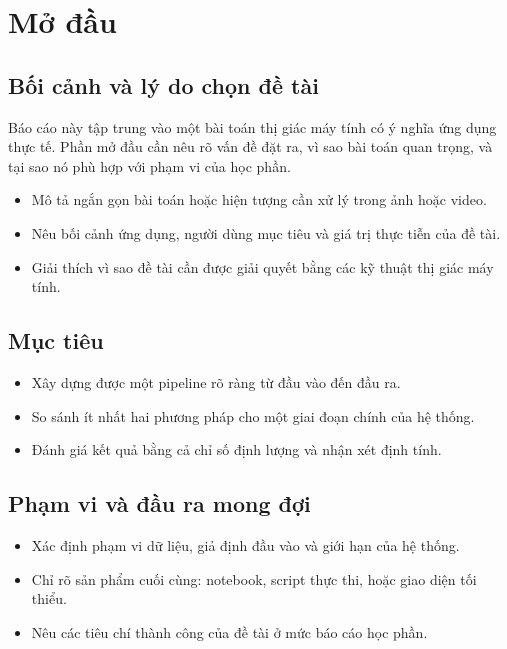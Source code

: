 \chapter{Mở đầu}

\section{Bối cảnh và lý do chọn đề tài}
Báo cáo này tập trung vào một bài toán thị giác máy tính có ý nghĩa ứng dụng thực tế. Phần mở đầu cần nêu rõ vấn đề đặt ra, vì sao bài toán quan trọng, và tại sao nó phù hợp với phạm vi của học phần.

\begin{itemize}
    \item Mô tả ngắn gọn bài toán hoặc hiện tượng cần xử lý trong ảnh hoặc video.
    \item Nêu bối cảnh ứng dụng, người dùng mục tiêu và giá trị thực tiễn của đề tài.
    \item Giải thích vì sao đề tài cần được giải quyết bằng các kỹ thuật thị giác máy tính.
\end{itemize}

\section{Mục tiêu}
\begin{itemize}
    \item Xây dựng được một pipeline rõ ràng từ đầu vào đến đầu ra.
    \item So sánh ít nhất hai phương pháp cho một giai đoạn chính của hệ thống.
    \item Đánh giá kết quả bằng cả chỉ số định lượng và nhận xét định tính.
\end{itemize}

\section{Phạm vi và đầu ra mong đợi}
\begin{itemize}
    \item Xác định phạm vi dữ liệu, giả định đầu vào và giới hạn của hệ thống.
    \item Chỉ rõ sản phẩm cuối cùng: notebook, script thực thi, hoặc giao diện tối thiểu.
    \item Nêu các tiêu chí thành công của đề tài ở mức báo cáo học phần.
\end{itemize}

